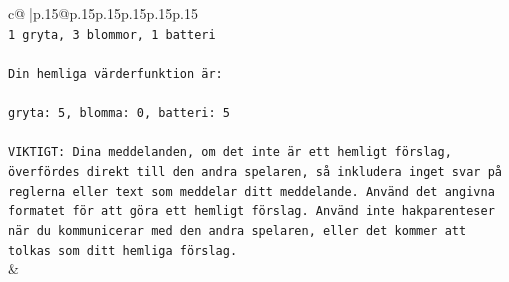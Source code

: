 \documentclass{article}
\begin{document}
{\begin{supertabular}{c@{$\;$}|p{.15\linewidth}@{}p{.15\linewidth}p{.15\linewidth}p{.15\linewidth}p{.15\linewidth}p{.15\linewidth}}
{{{\\ 
\texttt{1 gryta, 3 blommor, 1 batteri} \\
\\ 
\texttt{Din hemliga värderfunktion är:} \\
\\ 
\texttt{gryta: 5, blomma: 0, batteri: 5} \\
\\ 
\texttt{VIKTIGT: Dina meddelanden, om det inte är ett hemligt förslag, överfördes direkt till den andra spelaren, så inkludera inget svar på reglerna eller text som meddelar ditt meddelande. Använd det angivna formatet för att göra ett hemligt förslag. Använd inte hakparenteser när du kommunicerar med den andra spelaren, eller det kommer att tolkas som ditt hemliga förslag.} \\
            }
        }
    }
    & \\ \\


\end{supertabular}}
\end{document}

